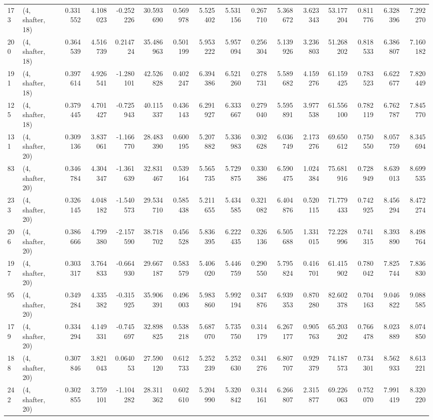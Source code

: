 \begin{tabular}{llrrrrrrrrrrrrrr}
173 &  (4, shafter, 18) &   0.331552 &   4.108023 & -0.252226 &   30.593690 &  0.569978 &   5.525402 &   5.531156 &  0.267710 &   5.368672 &   3.623343 &   53.177204 &  0.811776 &   6.328396 &   7.292270 \\
200 &  (4, shafter, 18) &   0.364539 &   4.516739 &  0.214724 &   35.486963 &  0.501199 &   5.953222 &   5.957094 &  0.256304 &   5.139926 &   3.236803 &   51.268202 &  0.818533 &   6.386807 &   7.160182 \\
191 &  (4, shafter, 18) &   0.397614 &   4.926541 & -1.280101 &   42.526828 &  0.402247 &   6.394386 &   6.521260 &  0.278731 &   5.589682 &   4.159276 &   61.159425 &  0.783523 &   6.622677 &   7.820449 \\
125 &  (4, shafter, 18) &   0.379445 &   4.701427 & -0.725943 &   40.115337 &  0.436143 &   6.291927 &   6.333667 &  0.279040 &   5.595891 &   3.977538 &   61.556100 &  0.782119 &   6.762787 &   7.845770 \\
131 &  (4, shafter, 20) &   0.309136 &   3.837061 & -1.166770 &   28.483390 &  0.600195 &   5.207882 &   5.336983 &  0.302628 &   6.036749 &   2.173276 &   69.650612 &  0.750550 &   8.057759 &   8.345694 \\
83  &  (4, shafter, 20) &   0.346784 &   4.304347 & -1.361639 &   32.831467 &  0.539164 &   5.565735 &   5.729875 &  0.330386 &   6.590475 &   1.024384 &   75.681916 &  0.728949 &   8.639013 &   8.699535 \\
233 &  (4, shafter, 20) &   0.326145 &   4.048182 & -1.540573 &   29.534710 &  0.585438 &   5.211655 &   5.434585 &  0.321082 &   6.404876 &   0.520115 &   71.779433 &  0.742925 &   8.456294 &   8.472274 \\
206 &  (4, shafter, 20) &   0.386666 &   4.799380 & -2.157590 &   38.718702 &  0.456528 &   5.836395 &   6.222435 &  0.326136 &   6.505688 &   1.331015 &   72.228996 &  0.741315 &   8.393890 &   8.498764 \\
197 &  (4, shafter, 20) &   0.303317 &   3.764833 & -0.664930 &   29.667187 &  0.583579 &   5.406020 &   5.446759 &  0.290550 &   5.795824 &   0.416701 &   61.415902 &  0.780042 &   7.825744 &   7.836830 \\
95  &  (4, shafter, 20) &   0.349284 &   4.335382 & -0.315925 &   35.906391 &  0.496003 &   5.983860 &   5.992194 &  0.347876 &   6.939353 &   0.870280 &   82.602378 &  0.704163 &   9.046822 &   9.088585 \\
179 &  (4, shafter, 20) &   0.334294 &   4.149331 & -0.745697 &   32.898825 &  0.538218 &   5.687070 &   5.735750 &  0.314179 &   6.267177 &   0.905763 &   65.203202 &  0.766478 &   8.023889 &   8.074850 \\
188 &  (4, shafter, 20) &   0.307846 &   3.821043 &  0.064053 &   27.590120 &  0.612733 &   5.252239 &   5.252630 &  0.341276 &   6.807707 &   0.929379 &   74.187573 &  0.734301 &   8.562933 &   8.613221 \\
242 &  (4, shafter, 20) &   0.302855 &   3.759101 & -1.104282 &   28.311362 &  0.602610 &   5.204990 &   5.320842 &  0.314161 &   6.266807 &   2.315877 &   69.226063 &  0.752070 &   7.991419 &   8.320220 \\
\bottomrule
\end{tabular}
